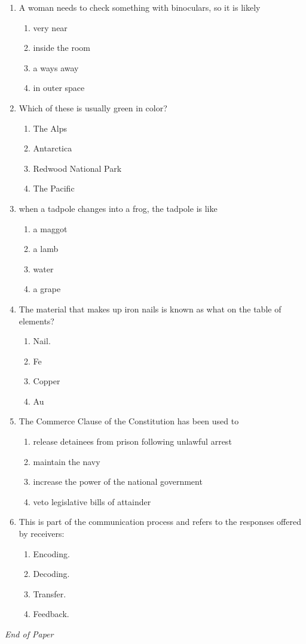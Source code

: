 \documentclass[12pt]{article}
\begin{document}
\begin{enumerate}[label=\arabic*.]
\begin{enumerate}[label=(\alph*)]
    \item 2,800
    \item 5,200
\end{enumerate}
\item A woman needs to check something with binoculars, so it is likely
\begin{enumerate}[label=(\alph*)]
    \item very near
    \item inside the room
    \item a ways away
    \item in outer space
\end{enumerate}
\item Which of these is usually green in color?
\begin{enumerate}[label=(\alph*)]
    \item The Alps
    \item Antarctica
    \item Redwood National Park
    \item The Pacific
\end{enumerate}
\item when a tadpole changes into a frog, the tadpole is like
\begin{enumerate}[label=(\alph*)]
    \item a maggot
    \item a lamb
    \item water
    \item a grape
\end{enumerate}
\item The material that makes up iron nails is known as what on the table of elements?
\begin{enumerate}[label=(\alph*)]
    \item Nail.
    \item Fe
    \item Copper
    \item Au
\end{enumerate}
\item The Commerce Clause of the Constitution has been used to
\begin{enumerate}[label=(\alph*)]
    \item release detainees from prison following unlawful arrest
    \item maintain the navy
    \item increase the power of the national government
    \item veto legislative bills of attainder
\end{enumerate}
\item This is part of the communication process and refers to the responses offered by receivers:
\begin{enumerate}[label=(\alph*)]
    \item Encoding.
    \item Decoding.
    \item Transfer.
    \item Feedback.
\end{enumerate}
\end{enumerate}

\vfill
\noindent\textit{End of Paper}
\end{document}
